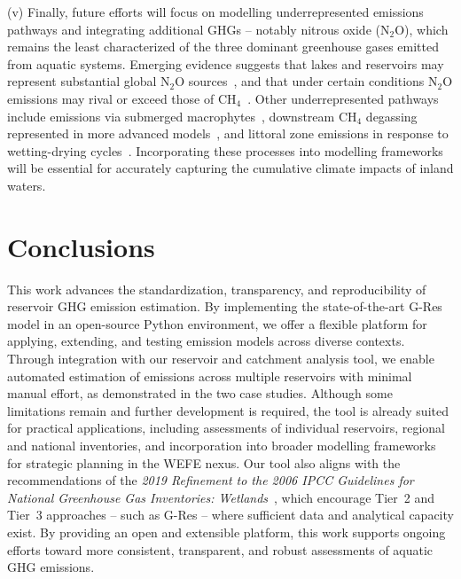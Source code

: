 \documentclass[review, authoryear, 1p]{elsarticle} %
\begin{document}
(v) Finally, future efforts will focus on modelling underrepresented emissions pathways and integrating additional \acp{GHG} -- notably nitrous oxide (N$_2$O), which remains the least characterized of the three dominant greenhouse gases emitted from aquatic systems.
Emerging evidence suggests that lakes and reservoirs may represent substantial global N$_2$O sources~\citep{Li2024}, and that under certain conditions N$_2$O emissions may rival or exceed those of CH$_4$~\citep{Chen2025}.
Other underrepresented pathways include emissions via submerged macrophytes~\citep{Hilt2022, Suraj2023}, downstream CH$_4$ degassing represented in more advanced models~\citep{Abbasi2020, Zhou2024}, and littoral zone emissions in response to wetting-drying cycles~\citep{Calamita2021, Ion2021}.
Incorporating these processes into modelling frameworks will be essential for accurately capturing the cumulative climate impacts of inland waters.

\section{Conclusions}
\label{sec:conclusions}

This work advances the standardization, transparency, and reproducibility of reservoir \acl{GHG} emission estimation.
By implementing the state-of-the-art G-Res model in an open-source Python environment, we offer a flexible platform for applying, extending, and testing emission models across diverse contexts.
Through integration with our reservoir and catchment analysis tool, we enable automated estimation of emissions across multiple reservoirs with minimal manual effort, as demonstrated in the two case studies.
Although some limitations remain and further development is required, the tool is already suited for practical applications, including assessments of individual reservoirs, regional and national inventories, and incorporation into broader modelling frameworks for strategic planning in the \ac{WEFE} nexus.
Our tool also aligns with the recommendations of the \emph{2019 Refinement to the 2006 \acs{IPCC} Guidelines for National Greenhouse Gas Inventories: Wetlands}~\citep{IPCC2019}, which encourage Tier~2 and Tier~3 approaches -- such as G-Res -- where sufficient data and analytical capacity exist.
By providing an open and extensible platform, this work supports ongoing efforts toward more consistent, transparent, and robust assessments of aquatic \ac{GHG} emissions.
\end{document}

